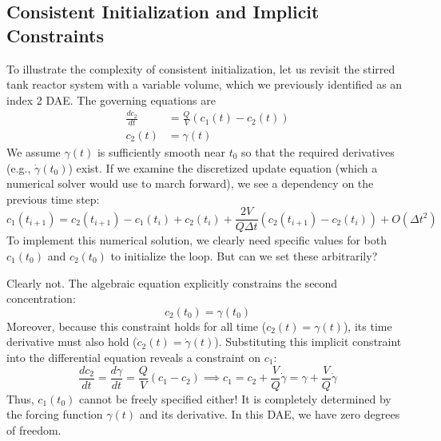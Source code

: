 \subsection{Consistent Initialization and Implicit Constraints}

To illustrate the complexity of consistent initialization, let us revisit the stirred tank reactor system with a variable volume, which we previously identified as an index 2 DAE. The governing equations are
\begin{equation}
    \begin{aligned}
        \frac{dc_2}{dt} &= \frac{Q}{V}(c_1(t) - c_2(t)) \\
        c_2(t) &= \gamma(t)
    \end{aligned}
\end{equation}
We assume $\gamma(t)$ is sufficiently smooth near $t_0$ so that the required derivatives (e.g., $\dot\gamma(t_0)$) exist. If we examine the discretized update equation (which a numerical solver would use to march forward), we see a dependency on the previous time step:
\begin{equation}
    c_1(t_{i+1}) = c_2(t_{i+1}) - c_1(t_i) + c_2(t_i) + \frac{2V}{Q\Delta t}(c_2(t_{i+1}) - c_2(t_i)) + O(\Delta t^2)
\end{equation}
To implement this numerical solution, we clearly need specific values for both $c_1(t_0)$ and $c_2(t_0)$ to initialize the loop. But can we set these arbitrarily?

Clearly not. The algebraic equation explicitly constrains the second concentration:
\begin{equation}
    c_2(t_0) = \gamma(t_0)
\end{equation}
Moreover, because this constraint holds for all time ($c_2(t) = \gamma(t)$), its time derivative must also hold ($\dot{c}_2(t) = \dot{\gamma}(t)$). Substituting this implicit constraint into the differential equation reveals a constraint on $c_1$:
\begin{equation}
    \frac{dc_2}{dt} = \frac{d\gamma}{dt} = \frac{Q}{V}(c_1 - c_2) \implies c_1 = c_2 + \frac{V}{Q}\dot{\gamma} = \gamma + \frac{V}{Q}\dot{\gamma}
\end{equation}
Thus, $c_1(t_0)$ cannot be freely specified either! It is completely determined by the forcing function $\gamma(t)$ and its derivative. In this DAE, we have zero degrees of freedom.

